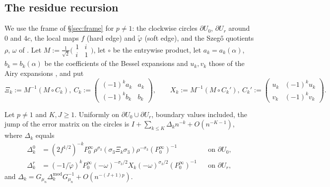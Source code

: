 \subsection{The residue recursion}\label{sec:recursion}
We use the frame of \S\ref{sec:frame} for $p\ne1$: the clockwise circles $\partial U_0$, $\partial U_r$ around $0$ and $4c$,
the local maps $f$ (hard edge) and $\tilde\varphi$ (soft edge), and the Szeg\H{o} quotients $\rho$, $\omega$ of
\cite[Sections~8--10]{PaperII}. Let $M:=\frac1{\sqrt2}\bigl(\begin{smallmatrix}1&i\\i&1\end{smallmatrix}\bigr)$, let $\circ$ be the
entrywise product, let $a_k=a_k(\alpha)$, $b_k=b_k(\alpha)$ be the coefficients of the Bessel expansions
\cite[(10.17.1), (10.17.8)]{DLMF} and $u_k,v_k$ those of the Airy expansions \cite[(9.7.2)]{DLMF}, and put
\[
  \Xi_k:=M^{-1}(M\circ C_k),\ C_k:=\begin{pmatrix}(-1)^ka_k&a_k\\(-1)^kb_k&b_k\end{pmatrix},\qquad
  X_k:=M^{-1}(M\circ C_k'),\ C_k':=\begin{pmatrix}u_k&(-1)^ku_k\\v_k&(-1)^kv_k\end{pmatrix}.
\]

\begin{lemma}\label{lem:N6a}
Let $p\ne1$ and $K,J\ge1$. Uniformly on $\partial U_0\cup\partial U_r$, boundary values included, the jump of the error
matrix on the circles is $I+\sum_{k\le K}\Delta_kn^{-k}+O(n^{-K-1})$, where $\Delta_k$ equals
\begin{align*}
  \Delta_k^0&=(2f^{1/2})^{-k}P_0^\infty\rho^{\sigma_3}(\sigma_3\Xi_k\sigma_3)\rho^{-\sigma_3}(P_0^\infty)^{-1}&&\text{on }\partial U_0,\\
  \Delta_k^r&=(-1/\tilde\varphi)^kP_0^\infty(-\omega)^{-\sigma_3/2}X_k(-\omega)^{\sigma_3/2}(P_0^\infty)^{-1}&&\text{on }\partial U_r,
\end{align*}
and $\Delta_k=G_{\mu_n}\Delta_k^{\mathrm{mod}}G_{\mu_n}^{-1}+O(n^{-(J+1)p})$.
\end{lemma}

